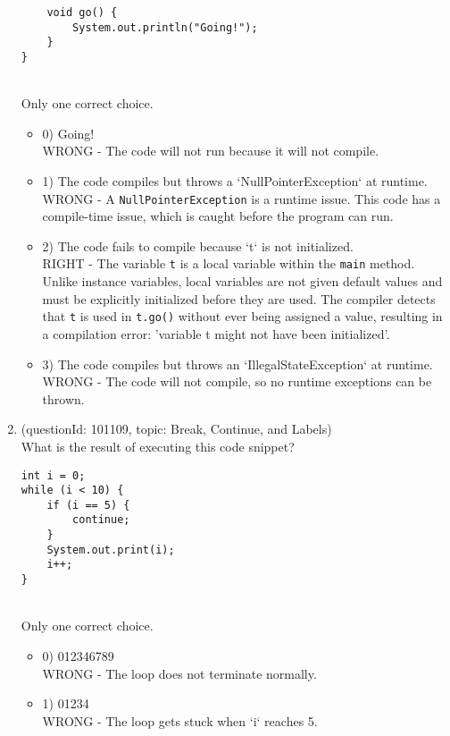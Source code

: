 \documentclass[12pt]{article}
\begin{document}
\begin{enumerate}[label=(\arabic*)]
\begin{verbatim}
    void go() {
        System.out.println("Going!");
    }
}
\end{verbatim}
\\ \noindent Only one correct choice. 
\begin{itemize}
\item 0) Going!
 \\ 
WRONG - The code will not run because it will not compile.

\item 1) The code compiles but throws a `NullPointerException` at runtime.
 \\ 
WRONG - A \verb|NullPointerException| is a runtime issue. This code has a compile-time issue, which is caught before the program can run.

\item 2) The code fails to compile because `t` is not initialized.
 \\ 
RIGHT - The variable \verb|t| is a local variable within the \verb|main| method. Unlike instance variables, local variables are not given default values and must be explicitly initialized before they are used. The compiler detects that \verb|t| is used in \verb|t.go()| without ever being assigned a value, resulting in a compilation error: 'variable t might not have been initialized'.

\item 3) The code compiles but throws an `IllegalStateException` at runtime.
 \\ 
WRONG - The code will not compile, so no runtime exceptions can be thrown.

\end{itemize}
\item (questionId: 101109, topic: Break, Continue, and Labels) \\ 
What is the result of executing this code snippet?\n\begin{verbatim}
int i = 0;
while (i < 10) {
    if (i == 5) {
        continue;
    }
    System.out.print(i);
    i++;
}
\end{verbatim}
\\ \noindent Only one correct choice. 
\begin{itemize}
\item 0) 012346789
 \\ 
WRONG - The loop does not terminate normally.

\item 1) 01234
 \\ 
WRONG - The loop gets stuck when `i` reaches 5.


\end{itemize}
\end{enumerate}
\end{document}
